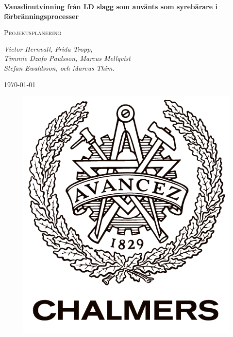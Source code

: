 \documentclass{article}
\begin{document}
\begin{titlepage}
\begin{centering}

{\huge\bfseries Vanadinutvinning från LD slagg som använts som syrebärare i förbränningsprocesser \par}
\vspace{1cm}
{\scshape\Large Projektsplanering \textbf{}\par}
{\scshape\Large \par}
{\Large\itshape Victor Hernvall, Frida Tropp,  \\ Timmie Dzafo Paulsson, Marcus Mellqvist \\ Stefan Ewaldsson, och Marcus Thim.\par}
{\large \today\par}

{   \par}
{   \par}
{    \par}


\begin{figure}[!ht]
\centering
\includegraphics[scale=0.3]{chalmers.png}
\label{fig:chalmers}

\end{figure}


\end{centering}
\end{titlepage}
\end{document}
